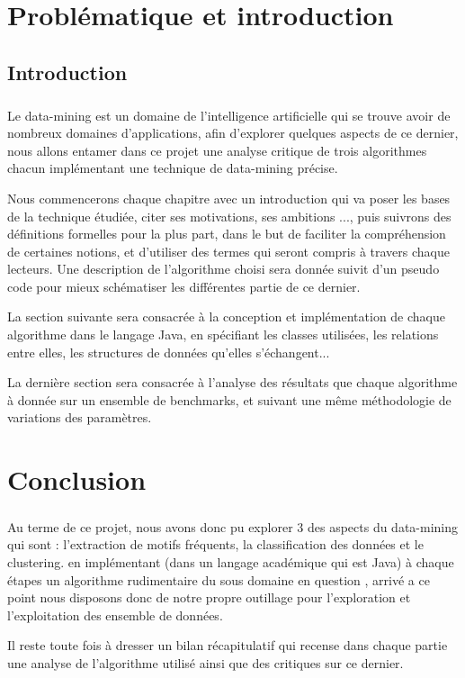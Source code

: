 \documentclass[12pt]{report}
\begin{document}
 
\tableofcontents

\newpage
\chapter{Problématique et introduction}
\section{Introduction}
		\paragraph{}
		Le data-mining est un domaine de l'intelligence artificielle qui se trouve avoir de nombreux domaines d'applications, afin d'explorer quelques aspects de ce dernier, nous allons entamer dans ce projet une analyse critique de trois algorithmes chacun implémentant une technique de data-mining précise.
		\par 
		Nous commencerons chaque chapitre avec un introduction qui va poser les bases de la technique étudiée, citer ses motivations, ses ambitions ..., puis suivrons des définitions formelles pour la plus part, dans le but de faciliter la compréhension de certaines notions, et d'utiliser des termes qui seront compris à travers chaque lecteurs. Une description de l'algorithme choisi sera donnée suivit d'un pseudo code pour mieux schématiser les différentes partie de ce dernier.
		\par La section suivante sera consacrée à la conception et implémentation de chaque algorithme dans le langage Java, en spécifiant les classes utilisées, les relations entre elles, les structures de données qu'elles s'échangent...
		\par La dernière section sera consacrée à l'analyse des résultats que chaque algorithme à donnée sur un ensemble de benchmarks, et suivant une même méthodologie de variations des paramètres.


\newpage

\newpage

\newpage

\chapter{Conclusion}
	\paragraph{}
	Au terme de ce projet, nous avons donc pu explorer 3 des aspects du data-mining qui sont : l'extraction de motifs fréquents, la classification des données et le clustering. en implémentant (dans un langage académique qui est Java) à chaque étapes un algorithme rudimentaire du sous domaine en question , arrivé a ce point nous disposons donc de notre propre outillage pour l'exploration et l'exploitation des ensemble de données.
	\par 
	Il reste toute fois à dresser un bilan récapitulatif qui recense dans chaque partie une analyse de l'algorithme utilisé ainsi que des critiques sur ce dernier.
\end{document}

